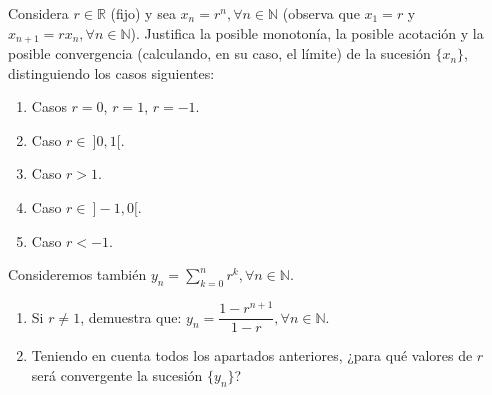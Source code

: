 \documentclass[12pt]{article}
\begin{document}
    \begin{ejercicio}
        [3.5 puntos] Considera $r \in \mathbb{R}$ (fijo) y sea $x_n = r^n, \forall n \in \mathbb{N}$ (observa que $x_1 = r$ y $x_{n+1} = r x_n, \forall n \in \mathbb{N}$). Justifica la posible monotonía, la posible acotación y la posible convergencia (calculando, en su caso, el límite) de la sucesión $\{x_n\}$, distinguiendo los casos siguientes:
        \begin{enumerate}
            \item Casos $r = 0$, $r = 1$, $r = -1$.
            \item Caso $r \in ~]0, 1[$.
            \item Caso $r > 1$.
            \item Caso $r \in ~]-1, 0[$.
            \item Caso $r < -1$.
        \end{enumerate}
        Consideremos también $y_n = \sum\limits_{k=0}^{n} r^k, \forall n \in \mathbb{N}$.
        \begin{enumerate}
            \item Si $r \neq 1$, demuestra que: $y_n = \dfrac{1 - r^{n+1}}{1 - r}, \forall n \in \mathbb{N}$.
            \item Teniendo en cuenta todos los apartados anteriores, ¿para qué valores de $r$ será convergente la sucesión $\{y_n\}$?
        \end{enumerate}
    \end{ejercicio}
        
        
\end{document}
